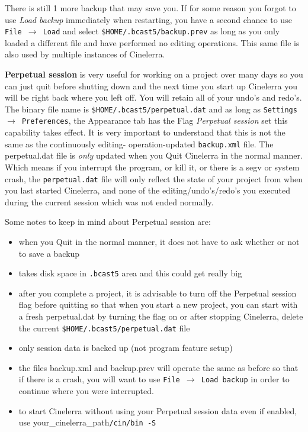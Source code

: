 There is still 1 more backup that may save you.  If for some reason you forgot to use \textit{Load backup} immediately when restarting, you have a second chance to use \texttt{File $\rightarrow$ Load} and select \texttt{\$HOME/.bcast5/backup.prev} as long as you only loaded a different file and have performed no editing operations.  This same file is also used by multiple instances of Cinelerra.

\textbf{Perpetual session} is very useful for working on a project over many days so you can just quit before shutting down and the next time you start up Cinelerra you will be right back where you left off.  
You will retain all of your undo’s and redo’s.  
The binary file name is \texttt{\$HOME/.bcast5/perpetual.dat} and as long as \texttt{Settings $\rightarrow$ Preferences}, the Appearance tab has the Flag \textit{Perpetual session} set this capability takes effect.  
It is very important to understand that this is not the same as the continuously editing- operation-updated \texttt{backup.xml} file.  
The perpetual.dat file is \textit{only} updated when you Quit Cinelerra in the normal manner.  
Which means if you interrupt the program, or kill it, or there is a segv or system crash, the \texttt{perpetual.dat} file will only reflect the state of your project from when you last started Cinelerra, and none of the editing/undo’s/redo’s you executed during the current session which was not ended normally.
\vspace{1ex}

Some notes to keep in mind about Perpetual session are:

\begin{itemize}
    \item when you Quit in the normal manner, it does not have to ask whether or not to save a backup
    \item takes disk space in \texttt{.bcast5} area and this could get really big
    \item after you complete a project, it is advisable to turn off the Perpetual session flag before quitting so
    that when you start a new project, you can start with a fresh perpetual.dat by turning the flag on or
    after stopping Cinelerra, delete the current \texttt{\$HOME/.bcast5/perpetual.dat} file
    \item only session data is backed up (not program feature setup)
    \item the files backup.xml and backup.prev will operate the same as before so that if there is a crash, you
    will want to use \texttt{File $\rightarrow$ Load backup} in order to continue where you were interrupted.
    \item to start Cinelerra without using your Perpetual session data even if enabled, use your\_cinelerra\_path\texttt{/cin/bin -S}
\end{itemize}

